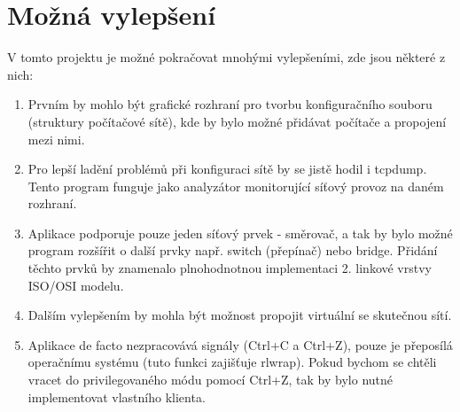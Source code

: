 \chapter{Možná vylepšení}

V tomto projektu je možné pokračovat mnohými vylepšeními, zde jsou některé z nich:

\begin{enumerate}
\item Prvním by mohlo být grafické rozhraní pro tvorbu konfiguračního souboru (struktury počítačové sítě), kde by bylo možné přidávat počítače a propojení mezi nimi.                                                                                                                                                                     

\item Pro lepší ladění problémů při konfiguraci sítě by se jistě hodil i tcpdump. Tento program funguje jako analyzátor monitorující síťový provoz na daném rozhraní.

\item Aplikace podporuje pouze jeden síťový prvek - směrovač, a tak by bylo možné program rozšířit o další prvky např. switch (přepínač) nebo bridge. Přidání těchto prvků by znamenalo plnohodnotnou implementaci 2. linkové vrstvy ISO/OSI modelu.

\item Dalším vylepšením by mohla být možnost propojit virtuální se skutečnou sítí. 

\item Aplikace de facto nezpracovává signály (Ctrl+C a Ctrl+Z), pouze je přeposílá operačnímu systému (tuto funkci zajišťuje rlwrap). Pokud bychom se chtěli vracet do privilegovaného módu pomocí Ctrl+Z, tak by bylo nutné implementovat vlastního klienta.
\end{enumerate}








